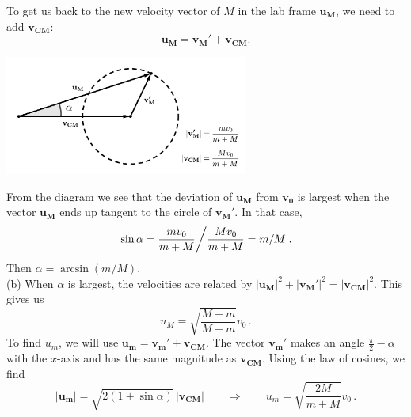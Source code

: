 \documentclass[../TST.tex]{subfiles}
\begin{document}
\begin{solution}
To get us back to the new velocity vector of $M$ in the lab frame $\mathbf{u_M}$, we need to add $\mathbf{v_{CM}}$:
\begin{equation*}
	\mathbf{u_M}=\mathbf{v_M'}+\mathbf{v_{CM}}
.
\end{equation*}
\begin{center}
\includegraphics[width=0.6\textwidth]{fig/a2008_s3.pdf}
\end{center}

From the diagram we see that the deviation of $\mathbf{u_M}$ from $\mathbf{v_0}$ is largest when the vector $\mathbf{u_M}$ ends up tangent to the circle of $\mathbf{v_M'}$. In that case,
\begin{equation*}
\left.	\sin{\alpha}=\frac{mv_0}{m+M} \middle/ \frac{Mv_0}{m+M} = m/M \right.
.
\end{equation*}
Then $\boxed{\alpha=\arcsin{(m/M)}.}$\\

(b) When $\alpha$ is largest, the velocities are related by $|\mathbf{u_M}|^2+|\mathbf{v_M'}|^2=|\mathbf{v_{CM}}|^2$. This gives us 
\begin{equation*}
\boxed{u_M=\sqrt{\frac{M-m}{M+m}}v_0}\,
.
\end{equation*}
To find $u_m$, we will use $\mathbf{u_m}=\mathbf{v_m'}+\mathbf{v_{CM}}$. The vector $\mathbf{v_m'}$ makes an angle $\frac{\pi}{2}-\alpha$ with the $x$-axis and has the same magnitude as $\mathbf{v_{CM}}$. Using the law of cosines, we find 
\begin{equation*}
	|\mathbf{u_m}|=\sqrt{2(1+\sin\alpha)}\, |\mathbf{v_{CM}}| \quad\quad\Rightarrow\quad\quad \boxed{u_m=\sqrt{\frac{2M}{m+M}}v_0}\,.
\end{equation*}
\end{solution}
\fi
\end{document}

